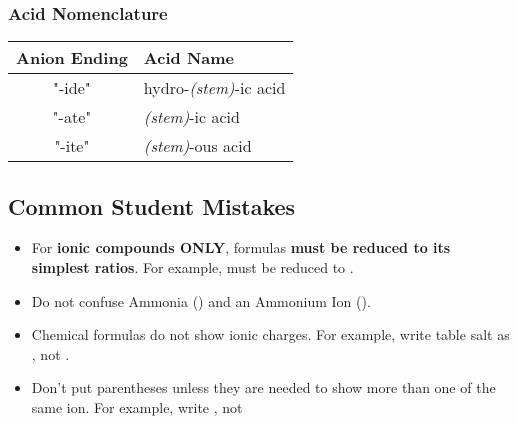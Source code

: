 \subsubsection{Acid Nomenclature}

\begin{table}[H]
\centering
\begin{tabular}{|c|l|}
\hline
\textbf{Anion Ending} & \textbf{Acid Name} \\
\hline
"-ide" & hydro-\textit{(stem)}-ic acid \\
"-ate" & \textit{(stem)}-ic acid \\
"-ite" & \textit{(stem)}-ous acid \\
\hline
\end{tabular}
\end{table}

\subsection{Common Student Mistakes}

\begin{itemize}
\item For \textbf{ionic compounds ONLY}, formulas \textbf{must be reduced to its simplest ratios}. For example,  must be reduced to .
\item Do not confuse Ammonia () and an Ammonium Ion ().
\item Chemical formulas do not show ionic charges. For example, write table salt as  , not .
\item Don't put parentheses unless they are needed to show more than one of the same ion. For example, write , not 
\end{itemize}


